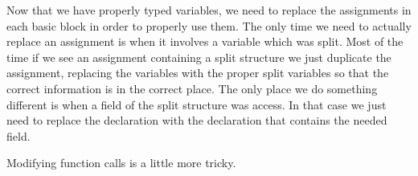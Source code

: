 \documentclass[prodmode,acmtecs]{acmsmall} %
\newcommand{\projectname}{{\texttt{STOUT}}}
\def \name{\projectname\xspace}
\begin{document}



\label{sec:assign}

Now that we have properly typed variables, we need to replace the assignments
in each basic block in order to properly use them. The only time we need
to actually replace an assignment is when it involves a variable which was
split.  
Most of the time if we see an assignment containing a split structure
we just duplicate the assignment, replacing the variables with the proper 
split variables so that the correct information is in the
correct place. The only place we do something different is when
a field of the split structure was access. In that case we 
just need to replace the declaration with the declaration
that contains the needed field.

\label{sec:funcall}

Modifying function calls is a little more tricky. 


\end{document}
